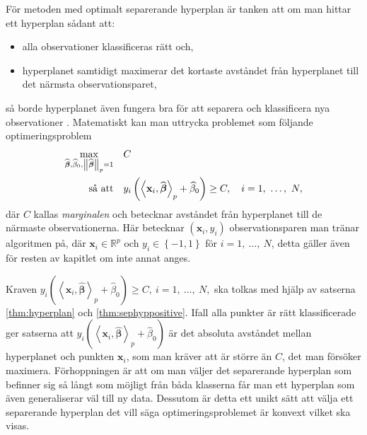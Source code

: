 \documentclass[a4paper, 12pt]{report}
\theoremstyle{definition}
\theoremstyle{remark}
\newtheorem*{rem}{Observation}
\newcommand{\bfbeta}{{\boldsymbol{\beta}}}
\newcommand{\bfx}{\mathbf{x}}
\newcommand{\llangle}{\left\langle}
\newcommand{\rrangle}{\right\rangle}
\newcommand{\inner}[2]{\llangle #1, #2 \rrangle}
\begin{document}
För metoden med optimalt separerande hyperplan är tanken att om man hittar ett hyperplan sådant att:
\begin{itemize}
	\item alla observationer klassificeras rätt och,
	\item hyperplanet samtidigt maximerar det kortaste avståndet från hyperplanet till det närmsta observationsparet,
\end{itemize}
så borde hyperplanet även fungera bra för att separera och klassificera nya observationer \cite{VapnikLerner1963}.
Matematiskt kan man uttrycka problemet som följande optimeringsproblem
\begin{equation}\label{opt:optimalmargin1}
\begin{aligned}
	 \operatornamewithlimits{max}_{\widehat{\bfbeta}, \widehat{\beta}_0, \left\|\widehat{\bfbeta}\right\|_p=1}& & &C\\
	 \text{så att}& & &y_i\left(\inner{\bfx_i}{\widehat{\bfbeta}}_p+\widehat{\beta}_0\right)\geq C,\quad i=1,~\dots,~N,
\end{aligned}
\end{equation}
där $C$ kallas \emph{marginalen} och betecknar avståndet från hyperplanet till de närmaste observationerna. Här betecknar $\left(\bfx_i, y_i\right)$ observationsparen man tränar algoritmen på, där $\bfx_i\in\mathbb{R}^p$ och $y_i\in\left\{-1, 1 \right\}$ för $i=1,~\dots,~N$, detta gäller även för resten av kapitlet om inte annat anges.

Kraven $y_i\left(\inner{\bfx_i}{\widehat{\bfbeta}}_p+\widehat{\beta}_0\right)\geq C, ~i=1,~\dots,~N,$ ska tolkas med hjälp av satserna \ref{thm:hyperplan} och \ref{thm:sephyppositive}. 
Ifall alla punkter är rätt klassificerade ger satserna att $y_i\left(\inner{\bfx_i}{\widehat{\bfbeta}}_p+\widehat{\beta}_0\right)$ är det absoluta avståndet mellan hyperplanet och punkten $\mathbf{x}_i$, som man kräver att är större än $C$, det man försöker maximera.
Förhoppningen är att om man väljer det separerande hyperplan som befinner sig så långt som möjligt från båda klasserna får man ett hyperplan som även generaliserar väl till ny data. Dessutom är detta ett unikt sätt att välja ett separerande hyperplan det vill säga optimeringsproblemet är konvext \cite{ESL} vilket ska visas. %
\end{document}
